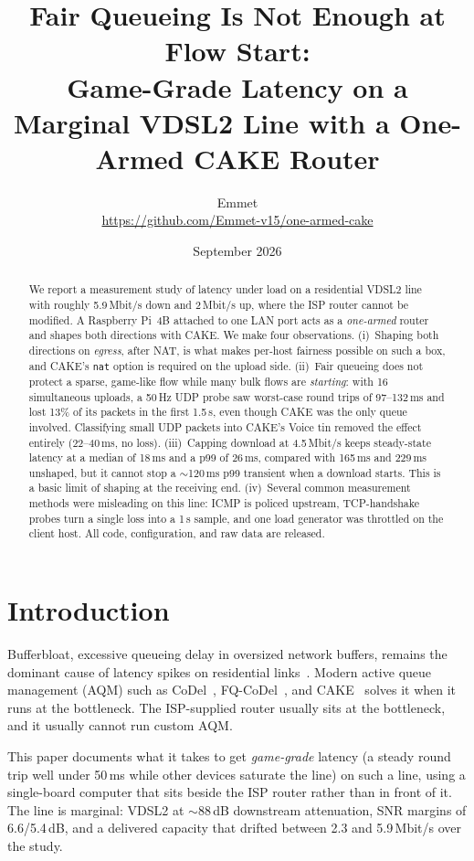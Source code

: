 \documentclass[10pt,twocolumn]{article}
\title{Fair Queueing Is Not Enough at Flow Start:\\
\large Game-Grade Latency on a Marginal VDSL2 Line with a One-Armed CAKE Router}
\author{Emmet\\\small\url{https://github.com/Emmet-v15/one-armed-cake}}
\date{September 2026}
\begin{document}
\maketitle

\begin{abstract}
We report a measurement study of latency under load on a residential VDSL2
line with roughly 5.9\,Mbit/s down and 2\,Mbit/s up, where the ISP router cannot
be modified. A Raspberry Pi~4B attached to one LAN port acts as a
\emph{one-armed} router and shapes both directions with CAKE. We make four
observations. (i)~Shaping both directions on \emph{egress}, after NAT, is what
makes per-host fairness possible on such a box, and CAKE's \texttt{nat} option
is required on the upload side. (ii)~Fair queueing does not protect a sparse,
game-like flow while many bulk flows are \emph{starting}: with 16 simultaneous
uploads, a 50\,Hz UDP probe saw worst-case round trips of 97--132\,ms and lost
13\% of its packets in the first 1.5\,s, even though CAKE was the only queue
involved. Classifying small UDP packets into CAKE's Voice tin removed the effect
entirely (22--40\,ms, no loss). (iii)~Capping download at 4.5\,Mbit/s keeps
steady-state latency at a median of 18\,ms and a p99 of 26\,ms, compared with 165\,ms and 229\,ms unshaped,
but it cannot stop a ${\sim}$120\,ms p99 transient when a download starts. This is a basic
limit of shaping at the receiving end. (iv)~Several common measurement methods were misleading on this
line: ICMP is policed upstream, TCP-handshake probes turn a single loss into a
1\,s sample, and one load generator was throttled on the client host.
All code, configuration, and raw data are released.
\end{abstract}

\section{Introduction}
Bufferbloat, excessive queueing delay in oversized network buffers, remains the
dominant cause of latency spikes on residential links~\cite{gettys2011}. Modern
active queue management (AQM) such as CoDel~\cite{codel,rfc8289},
FQ-CoDel~\cite{rfc8290}, and CAKE~\cite{cake} solves it when it runs at the
bottleneck. The ISP-supplied router usually sits at the bottleneck, and it
usually cannot run custom AQM.

This paper documents what it takes to get \emph{game-grade} latency (a steady
round trip well under 50\,ms while other devices saturate the line) on such a line,
using a single-board computer that sits beside the ISP router rather than in
front of it. The line is marginal: VDSL2 at ${\sim}$88\,dB downstream
attenuation, SNR margins of 6.6/5.4\,dB, and a delivered capacity that drifted
between 2.3 and 5.9\,Mbit/s over the study.
\end{document}

